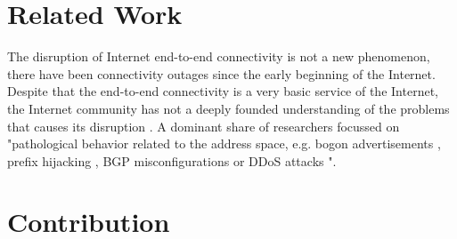 \section{Related Work\label{sec:related_work}}
The disruption of Internet end-to-end connectivity is not a new phenomenon, there have been connectivity outages since the early beginning of the Internet. Despite that the end-to-end connectivity is a very basic service of the Internet, the Internet community has not a deeply founded understanding of the problems that causes its disruption \citep{Bush:Optometry}. A dominant share of researchers focussed on "pathological behavior related to the address space, e.g. bogon advertisements \citep{Feamster:2005}, prefix hijacking \citep{Zhang:2010}, BGP misconfigurations \citep{Mahajan:2002} or DDoS attacks \citep{Chen:2001}"\citep{Bush:Optometry}.




\section{Contribution\label{sec:contribution}}


